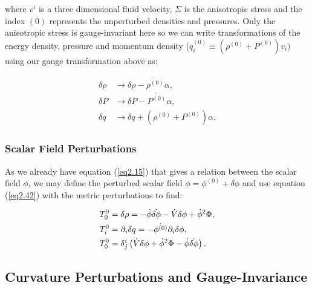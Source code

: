 \documentclass[a4paper,12pt,twoside]{report}
\begin{document}
where $v^{i}$ is a three dimensional fluid velocity, $\Sigma$ is the anisotropic stress and the index $(0)$ represents the unperturbed densities and pressures. Only the anisotropic stress is gauge-invariant here so we can write transformations of the energy density, pressure and momentum density ($q^{(0)}_i \equiv (\rho^{(0)} + P^{(0)})v_{i})$ using our gauge transformation above as:

\begin{subequations}
\begin{align}
\delta \rho &\rightarrow \delta \rho - \dot{\rho^{(0)}} \alpha, \label{eq2.43a} \\
\delta P &\rightarrow \delta P - \dot{P^{(0)}} \alpha, \label{eq2.43b} \\
\delta q &\rightarrow \delta q + (\rho^{(0)} + P^{(0)}) \alpha. \label{eq2.43c}
\end{align}
\end{subequations}

\subsubsection{Scalar Field Perturbations} \label{subsubsec:ScalFieldPerturbs}

As we already have equation (\ref{eq2.15}) that gives a relation between the scalar field $\phi$, we may define the perturbed scalar field $\phi = \phi^{(0)} + \delta \phi$ and use equation (\ref{eq2.42}) with the metric perturbations to find:

\begin{subequations}
\begin{align}
\tensor*{T}{_0^0} &= \delta \rho = -\dot{\phi}\dot{\delta \phi} - \dot{V}\delta \phi + \dot{\phi}^{2}\Phi, \label{eq2.44a} \\
\tensor*{T}{_i^0} &= \partial_{i} \delta q = -\dot{\phi^{(0)}}\partial_{i}\delta\phi, \label{eq2.44b} \\
\tensor*{T}{_0^0} &= \tensor*{\delta}{^i_j}\left( \dot{V} \delta \phi + \dot{\phi}^{2} \Phi - \dot{\phi} \dot{\delta \phi} \right) . \label{eq2.44c}
\end{align}
\end{subequations}

\subsection{Curvature Perturbations and Gauge-Invariance} \label{subsec:CurvPerturbsGaugeInvar}
\end{document}
